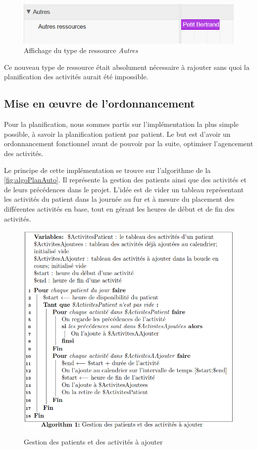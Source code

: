 \documentclass[noposter]{polytech/polytech}
\begin{document}
\begin{figure}
	\includegraphics[scale=0.75]{images/autresRessources}
	\caption{Affichage du type de ressource \textit{Autres}}
	\label{fig:autresRessources}
\end{figure}

Ce nouveau type de ressource était absolument nécessaire à rajouter sans quoi la planification des activités aurait été impossible. 


\subsection{Mise en œuvre de l'ordonnancement}

Pour la planification, nous sommes partis sur l'implémentation la plus simple possible, à savoir la planification patient par patient. Le but est d'avoir un ordonnancement fonctionnel avant de pouvoir par la suite, optimiser l'agencement des activités. 

Le principe de cette implémentation se trouve sur l'algorithme de la \autoref{fig:algoPlanAuto}. Il représente la gestion des patients ainsi que des activités et de leurs précédences dans le projet. L'idée est de vider un tableau représentant les activités du patient dans la journée au fur et à mesure du placement des différentes activités en base, tout en gérant les heures de début et de fin des activités. 

\begin{figure}
	\includegraphics[scale=0.75]{images/algoPlanAutoTex}
	\label{fig:algoPlanAuto}
	\caption{Gestion des patients et des activités à ajouter}
\end{figure}
\end{document}
